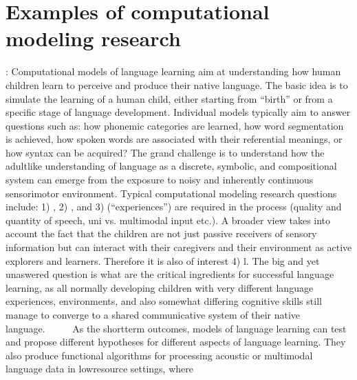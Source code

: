 \documentclass[letterpaper,10pt,english]{jupyterBook}
\begin{document}
\section{Examples of computational modeling research}
\label{\detokenize{Computational_models_of_human_language_processing:examples-of-computational-modeling-research}}
\sphinxAtStartPar
{}: Computational
models of language learning aim at understanding how human children
learn to perceive and produce their native language. The basic idea is
to simulate the learning of a human child, either starting from “birth”
or from a specific stage of language development. Individual models
typically aim to answer questions such as: how phonemic categories are
learned, how word segmentation is achieved, how spoken words are
associated with their referential meanings, or how syntax can be
acquired? The grand challenge is to understand how the adult\sphinxhyphen{}like
understanding of language as a discrete, symbolic, and compositional
system can emerge from the exposure to noisy and inherently continuous
sensorimotor environment. Typical computational modeling research
questions include: 1) , 2) , and 3)  (“experiences”) are required in the process (quality and
quantity of speech, uni\sphinxhyphen{} vs. multimodal input etc.). A broader view
takes into account the fact that the children are not just passive
receivers of sensory information but can interact with their caregivers
and their environment as active explorers and learners. Therefore it is
also of interest 4) l. The big
and yet unaswered question is what are the critical ingredients for
successful language learning, as all normally developing children with
very different language experiences, environments, and also somewhat
differing cognitive skills still manage to converge to a shared
communicative system of their native language.      As the short\sphinxhyphen{}term outcomes, models of language learning can test
and propose different hypotheses for different aspects of language
learning. They also produce functional algorithms for processing
acoustic or multimodal language data in low\sphinxhyphen{}resource settings, where
\end{document}

